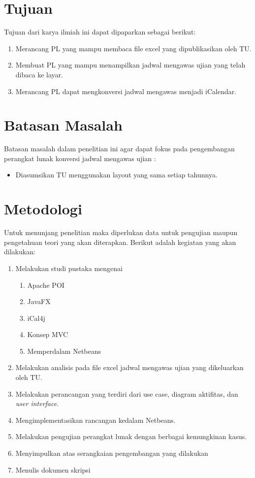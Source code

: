 \section{Tujuan}
\label{sec:tujuan}
Tujuan dari karya ilmiah ini dapat dipaparkan sebagai berikut:
\begin{enumerate}
	\item Merancang PL yang mampu membaca file excel yang dipublikasikan oleh TU.
	\item Membuat PL yang mampu menampilkan jadwal mengawas ujian yang telah dibaca ke layar.
	\item Merancang PL dapat mengkonversi jadwal mengawas menjadi iCalendar.
\end{enumerate}

\section{Batasan Masalah}
\label{sec:batasan}
Batasan masalah dalam penelitian ini agar dapat fokus pada pengembangan perangkat lunak konversi jadwal mengawas ujian :
\begin{itemize}
	\item Diasumsikan TU menggunakan layout yang sama setiap tahunnya.  
\end{itemize}

\section{Metodologi}
\label{sec:metlit}
Untuk menunjang penelitian maka diperlukan data untuk pengujian maupun pengetahuan teori yang akan diterapkan. Berikut adalah kegiatan yang akan dilakukan:
\begin{enumerate}
		\item Melakukan studi pustaka mengenai
			\begin{enumerate}
				\item Apache POI
				\item JavaFX
				\item iCal4j
				\item Konsep MVC
				\item Memperdalam Netbeans
			\end{enumerate}
		\item Melakukan analisis pada file excel jadwal mengawas ujian yang dikeluarkan oleh TU.
		\item Melakukan perancangan yang terdiri dari use case, diagram aktifitas, dan \textit{user interface}.
		\item Mengimplementasikan rancangan kedalam Netbeans. 
		\item Melakukan pengujian perangkat lunak dengan berbagai kemungkinan kasus.
		\item Menyimpulkan atas serangkaian pengembangan yang dilakukan
		\item Menulis dokumen skripsi
	\end{enumerate}

